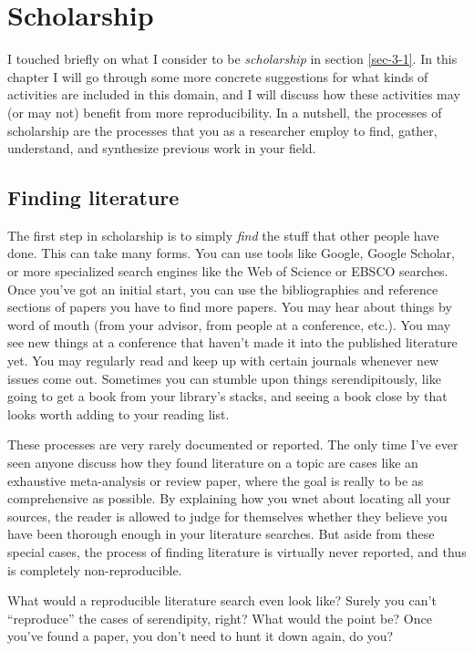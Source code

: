 \documentclass{book}
\begin{document}
\chapter{Scholarship}
\label{sec-4}
\label{scholarship}

I touched briefly on what I consider to be \emph{scholarship} in section \ref{sec-3-1}. In this chapter I will go through some more concrete suggestions for what kinds of activities are included in this domain, and I will discuss how these activities may (or may not) benefit from more reproducibility. In a nutshell, the processes of scholarship are the processes that you as a researcher employ to find, gather, understand, and synthesize previous work in your field.
\section{Finding literature}
\label{sec-4-1}

The first step in scholarship is to simply \emph{find} the stuff that other people have done. This can take many forms. You can use tools like Google, Google Scholar, or more specialized search engines like the Web of Science or EBSCO searches.  Once you've got an initial start, you can use the bibliographies and reference sections of papers you have to find more papers. You may hear about things by word of mouth (from your advisor, from people at a conference, etc.). You may see new things at a conference that haven't made it into the published literature yet.  You may regularly read and keep up with certain journals whenever new issues come out. Sometimes you can stumble upon things serendipitously, like going to get a book from your library's stacks, and seeing a book close by that looks worth adding to your reading list.

These processes are very rarely documented or reported. The only time I've ever seen anyone discuss how they found literature on a topic are cases like an exhaustive meta-analysis or review paper, where the goal is really to be as comprehensive as possible. By explaining how you wnet about locating all your sources, the reader is allowed to judge for themselves whether they believe you have been thorough enough in your literature searches.  But aside from these special cases, the process of finding literature is virtually never reported, and thus is completely non-reproducible.

What would a reproducible literature search even look like?  Surely you can't ``reproduce'' the cases of serendipity, right?  What would the point be?  Once you've found a paper, you don't need to hunt it down again, do you?
\end{document}
